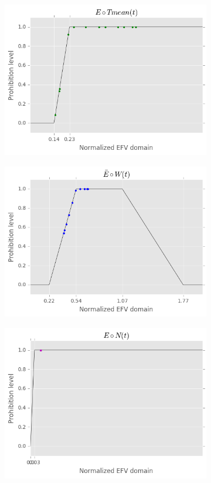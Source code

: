 \documentclass[paper=a4, fontsize=11pt]{scrartcl}
\numberwithin{equation}{section}		%
\numberwithin{figure}{section}			%
\numberwithin{table}{section}				%
\begin{document}
\begin{figure}[ht]
\begin{subfigure}{.33\textwidth}
\includegraphics[scale=0.33]{E_Tm.png}
\caption{}
\label{E_Tm}
\end{subfigure}
\begin{subfigure}{.33\textwidth}
\includegraphics[scale=0.33]{E_W.png}
\caption{}
\label{E_W}
\end{subfigure}
\begin{subfigure}{.33\textwidth}
\includegraphics[scale=0.33]{E_N.png}

\end{subfigure}
\end{figure}
\end{document}
